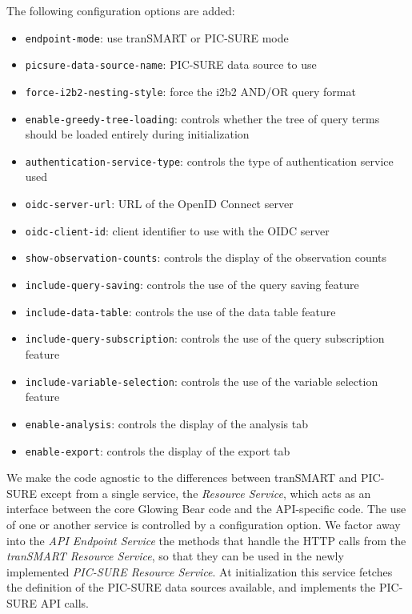 The following configuration options are added:
\begin{itemize}
    \setlength\itemsep{0em}

    \item \verb|endpoint-mode|: use tranSMART or PIC-SURE mode
    \item \verb|picsure-data-source-name|: PIC-SURE data source to use
    \item \verb|force-i2b2-nesting-style|: force the i2b2 AND/OR query format
    \item \verb|enable-greedy-tree-loading|: controls whether the tree of query terms should be loaded entirely during initialization \\

    \item \verb|authentication-service-type|: controls the type of authentication service used
    \item \verb|oidc-server-url|: URL of the OpenID Connect server
    \item \verb|oidc-client-id|: client identifier to use with the OIDC server \\
    
    \item \verb|show-observation-counts|: controls the display of the observation counts
    \item \verb|include-query-saving|: controls the use of the query saving feature
    \item \verb|include-data-table|: controls the use of the data table feature
    \item \verb|include-query-subscription|: controls the use of the query subscription feature
    \item \verb|include-variable-selection|: controls the use of the variable selection feature
    \item \verb|enable-analysis|: controls the display of the analysis tab
    \item \verb|enable-export|: controls the display of the export tab

\end{itemize}

We make the code agnostic to the differences between tranSMART and PIC-SURE except from a single service, the \emph{Resource Service}, which acts as an interface between the core Glowing Bear code and the API-specific code.
The use of one or another service is controlled by a configuration option.
We factor away into the \emph{API Endpoint Service} the methods that handle the HTTP calls from the \emph{tranSMART Resource Service}, so that they can be used in the newly implemented \emph{PIC-SURE Resource Service}.
At initialization this service fetches the definition of the PIC-SURE data sources available, and implements the PIC-SURE API calls.


